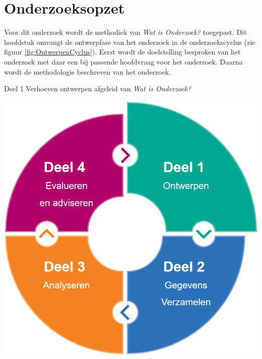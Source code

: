 \chapter{Onderzoeksopzet}
\label{chap:Onderzoeksopzet}
Voor dit onderzoek wordt de methodiek van \textit{Wat is Onderzoek?} \Parencite{Verhoeven} toegepast. 
Dit hoofdstuk omvangt de ontwerpfase van het onderzoek in de onderzoekscyclus (zie figuur \ref{fig:OntwerpenCyclus}).
Eerst wordt de doelstelling besproken van het onderzoek met daar een bij passende hoofdvraag voor het onderzoek.
Daarna wordt de methodologie beschreven van het onderzoek.

\begin{graphic}
	\vspace{0.2cm}
	\captionsetup{type=figure}
    \caption{Deel 1 Verhoeven ontwerpen afgeleid van \textit{Wat is Onderzoek?}}
	\includegraphics[scale=0.3]{img/OntwerpenCyclus.png}
	\label{fig:OntwerpenCyclus}
	\vspace{0.2cm}
\end{graphic}


\newpage

% 
% 
